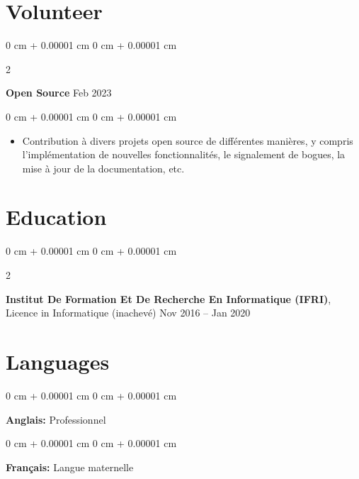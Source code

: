 \documentclass[10pt, letterpaper]{article}
\newenvironment{highlights}{
    \begin{itemize}[
        topsep=0.10 cm,
        parsep=0.10 cm,
        partopsep=0pt,
        itemsep=0pt,
        leftmargin=0 cm + 10pt
    ]
}{
    \end{itemize}
} %
\newenvironment{onecolentry}{
    \begin{adjustwidth}{
        0 cm + 0.00001 cm
    }{
        0 cm + 0.00001 cm
    }
}{
    \end{adjustwidth}
} %
\newenvironment{twocolentry}[2][]{
    \onecolentry
    \def\secondColumn{#2}
    \setcolumnwidth{\fill, 4.5 cm}
    \begin{paracol}{2}
}{
    \switchcolumn \raggedleft \secondColumn
    \end{paracol}
    \endonecolentry
} %
\begin{document}
    
    \section{Volunteer}



        
        \begin{twocolentry}{
            Feb 2023
        }
            \textbf{Open Source}\end{twocolentry}

        \vspace{0.10 cm}
        \begin{onecolentry}
            \begin{highlights}
                \item Contribution à divers projets open source de différentes manières, y compris l'implémentation de nouvelles fonctionnalités, le signalement de bogues, la mise à jour de la documentation, etc.
            \end{highlights}
        \end{onecolentry}



    
    \section{Education}



        
        \begin{twocolentry}{
            Nov 2016 – Jan 2020
        }
            \textbf{Institut De Formation Et De Recherche En Informatique (IFRI)}, Licence in Informatique (inachevé)\end{twocolentry}




    
    \section{Languages}



        
        \begin{onecolentry}
            \textbf{Anglais:} Professionnel
        \end{onecolentry}

        \vspace{0.2 cm}

        \begin{onecolentry}
            \textbf{Français:} Langue maternelle
        \end{onecolentry}
\end{document}
